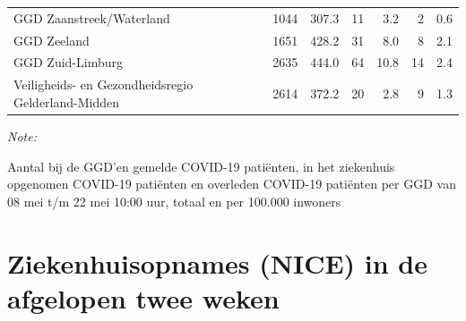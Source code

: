 \documentclass[
  english,
  man,floatsintext]{apa6}
\begin{document}
\begin{table}
\begin{threeparttable}
\begin{tabular}{lrrrrrr}
GGD Zaanstreek/Waterland & 1044 & 307.3 & 11 & 3.2 & 2 & 0.6\\
GGD Zeeland & 1651 & 428.2 & 31 & 8.0 & 8 & 2.1\\
GGD Zuid-Limburg & 2635 & 444.0 & 64 & 10.8 & 14 & 2.4\\
Veiligheids- en Gezondheidsregio Gelderland-Midden & 2614 & 372.2 & 20 & 2.8 & 9 & 1.3\\
\bottomrule
\end{tabular}
\begin{tablenotes}
\item \textit{Note: } 
\item Aantal bij de GGD’en gemelde COVID-19 patiënten, in het ziekenhuis opgenomen COVID-19 patiënten en overleden COVID-19 patiënten per GGD van 08 mei t/m 22 mei 10:00 uur, totaal en per 100.000 inwoners
\end{tablenotes}
\end{threeparttable}
\endgroup{}
\end{table}

\newpage

\hypertarget{ziekenhuisopnames-nice-in-de-afgelopen-twee-weken}{%
\section{Ziekenhuisopnames (NICE) in de afgelopen twee weken}\label{ziekenhuisopnames-nice-in-de-afgelopen-twee-weken}}
\end{document}
